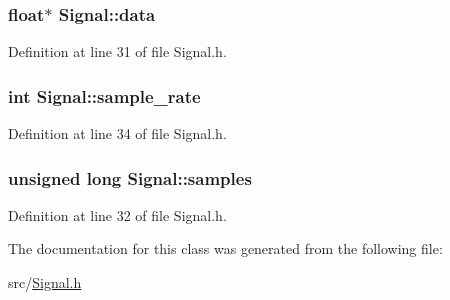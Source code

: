 \hypertarget{class_signal_aa9322b424cb7f66597c8ab19ac402423}{
\subsubsection[{data}]{\setlength{\rightskip}{0pt plus 5cm}float$\ast$ {\bf \-Signal\-::data}}}\label{class_signal_aa9322b424cb7f66597c8ab19ac402423}


\-Definition at line 31 of file \-Signal.\-h.

\hypertarget{class_signal_ad07ccb1653bcd36f89f095c7bf7ae877}{
\subsubsection[{sample\-\_\-rate}]{\setlength{\rightskip}{0pt plus 5cm}int {\bf \-Signal\-::sample\-\_\-rate}}}\label{class_signal_ad07ccb1653bcd36f89f095c7bf7ae877}


\-Definition at line 34 of file \-Signal.\-h.

\hypertarget{class_signal_a8a51dd9d0f5937b3f3406e66a4d8fc57}{
\subsubsection[{samples}]{\setlength{\rightskip}{0pt plus 5cm}unsigned long {\bf \-Signal\-::samples}}}\label{class_signal_a8a51dd9d0f5937b3f3406e66a4d8fc57}


\-Definition at line 32 of file \-Signal.\-h.



\-The documentation for this class was generated from the following file\-:\begin{DoxyCompactItemize}
\item 
src/\hyperlink{_signal_8h}{\-Signal.\-h}\end{DoxyCompactItemize}
